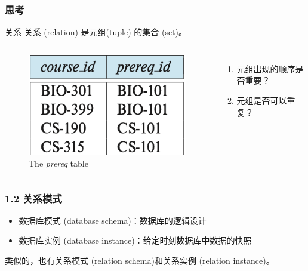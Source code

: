 \documentclass[aspectratio=169, 14pt]{beamer}
\begin{document}
\begin{frame}
    \frametitle{思考}
\begin{block}{关系}
    关系 (relation) 是元组(tuple) 的集合 (set)。
\end{block}
    
\begin{columns}
    \begin{figure}
        \includegraphics[height=.35\paperheight]{table/prereq}
        \caption*{The \emph{prereq} table} 
    \end{figure}
    \begin{enumerate}
        \item 元组出现的顺序是否重要？
        \item 元组是否可以重复？
    \end{enumerate}
\end{columns}

\end{frame}

\begin{frame}
    \frametitle{1.2 关系模式}
\begin{itemize}
    \item 数据库模式 (database schema)：数据库的逻辑设计
    \item 数据库实例 (database instance)：给定时刻数据库中数据的快照
\end{itemize}
    类似的，也有关系模式 (relation schema)和关系实例 (relation instance)。

\end{frame}
\end{document}
